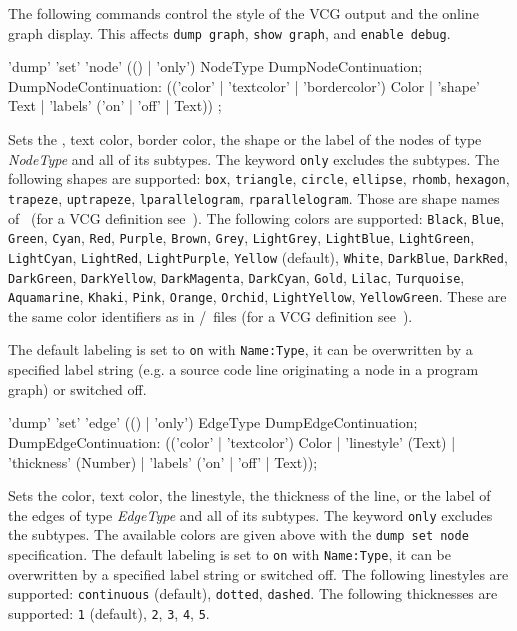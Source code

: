 The following commands control the style of the VCG output and the online graph display.
This affects \texttt{dump graph}, \texttt{show graph}, and \texttt{enable debug}.
\begin{rail}
  'dump' 'set' 'node' (() | 'only') NodeType DumpNodeContinuation;
DumpNodeContinuation:
 (('color' | 'textcolor' | 'bordercolor') Color | 'shape' Text | 'labels' ('on' | 'off' | Text)) ;
\end{rail}
Sets the , text color, border color, the shape or the label of the nodes of type \emph{NodeType} and all of its subtypes.
The keyword \texttt{only} excludes the subtypes. 
The following shapes are supported: \texttt{box}, \texttt{triangle}, \texttt{circle}, \texttt{ellipse}, \texttt{rhomb}, \texttt{hexagon}, \texttt{trapeze}, \texttt{uptrapeze}, \texttt{lparallelogram}, \texttt{rparallelogram}.
Those are shape names of \yComp\ (for a VCG definition see~\cite{vcg}).
The following colors are supported: \texttt{Black}, \texttt{Blue}, \texttt{Green}, \texttt{Cyan}, \texttt{Red}, \texttt{Purple}, \texttt{Brown}, \texttt{Grey}, \texttt{LightGrey}, \texttt{LightBlue}, \texttt{LightGreen}, \texttt{LightCyan}, \texttt{LightRed}, \texttt{LightPurple}, \texttt{Yel\-low} (default), \texttt{White}, \texttt{DarkBlue}, \texttt{DarkRed}, \texttt{Dark\-Green}, \texttt{DarkYellow}, \texttt{DarkMagenta}, \texttt{DarkCyan}, \texttt{Gold}, \texttt{Lilac}, \texttt{Turquoise}, \texttt{Aquamarine}, \texttt{Khaki}, \texttt{Pink}, \texttt{Orange}, \texttt{Orchid}, \texttt{LightYellow}, \texttt{YellowGreen}.
These are the same color identifiers as in /\yComp\ files (for a VCG definition see~\cite{vcg}).

The default labeling is set to \texttt{on} with \texttt{Name:Type}, it can be overwritten by a specified label string (e.g. a source code line originating a node in a program graph) or switched off.

\begin{rail}
  'dump' 'set' 'edge' (() | 'only') EdgeType DumpEdgeContinuation;
DumpEdgeContinuation:
  (('color' | 'textcolor') Color | 'linestyle' (Text) | 'thickness' (Number) | 'labels' ('on' | 'off' | Text));
\end{rail}
Sets the color, text color, the linestyle, the thickness of the line, or the label of the edges of type \emph{EdgeType} and all of its subtypes.
The keyword \texttt{only} excludes the subtypes. 
The available colors are given above with the \texttt{dump set node} specification.
The default labeling is set to \texttt{on} with \texttt{Name:Type}, it can be overwritten by a specified label string or switched off.
The following linestyles are supported: \texttt{continuous} (default), \texttt{dotted}, \texttt{dashed}.
The following thicknesses are supported: \texttt{1} (default), \texttt{2}, \texttt{3}, \texttt{4}, \texttt{5}.

